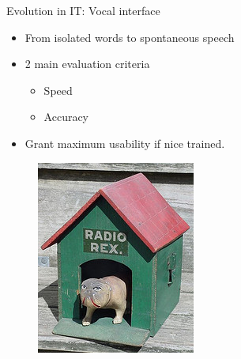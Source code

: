 \documentclass{beamer}
\begin{document}
\begin{frame}{Evolution in IT: Vocal interface}
\begin{itemize}
\item From isolated words to spontaneous speech
\item 2 main evaluation criteria
\begin{itemize}
	\item Speed
	\item Accuracy
\end{itemize}
\item Grant maximum usability if nice trained.
\end{itemize}
\begin{figure}[ht]
\begin{minipage}[b]{0.30\linewidth}
\centering
\includegraphics[width=\textwidth]{radio-rex.jpg}



\end{minipage}
\end{figure}
\end{frame}
\end{document}
